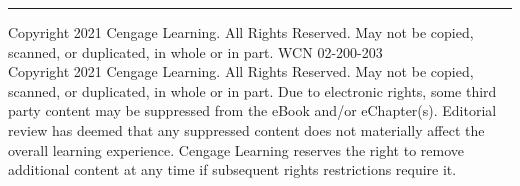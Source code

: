\vspace{0.7cm}
\noindent
{\color{stewartcyan}\rule{\linewidth}{0.6pt}}

\vspace{2pt}
\noindent
\begin{minipage}{\textwidth}
    \fontsize{5.5pt}{7pt}\selectfont\color{gray!80!black}
    \raggedright
    Copyright 2021 Cengage Learning. All Rights Reserved. May not be copied, scanned, or duplicated, in whole or in part. WCN 02-200-203\\[1pt]
    Copyright 2021 Cengage Learning. All Rights Reserved. May not be copied, scanned, or duplicated, in whole or in part. Due to electronic rights, some third party content may be suppressed from the eBook and/or eChapter(s). Editorial review has deemed that any suppressed content does not materially affect the overall learning experience. Cengage Learning reserves the right to remove additional content at any time if subsequent rights restrictions require it.
\end{minipage}
